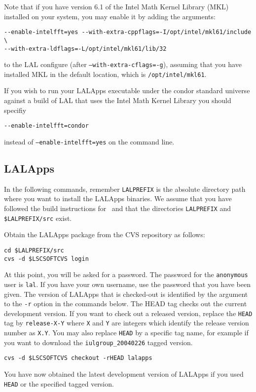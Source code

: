 Note that if you have version 6.1 of the Intel Math Kernel Library (MKL)
installed on your system, you may enable it by adding the arguments:
\begin{verbatim}
--enable-intelfft=yes --with-extra-cppflags=-I/opt/intel/mkl61/include \
--with-extra-ldflags=-L/opt/intel/mkl61/lib/32
\end{verbatim}
to the LAL configure (after \texttt{--with-extra-cflags=-g}), assuming that
you have installed MKL in the default location, which is
\texttt{/opt/intel/mkl61}.

If you wish to run your LALApps executable under the condor standard universe
against a build of LAL that uses the Intel Math Kernel Library you should
specifiy
\begin{verbatim}
--enable-intelfft=condor
\end{verbatim}
instead of \texttt{--enable-intelfft=yes} on the command line.


\color{black}
\subsection{LALApps}
\color{black}

In the following commands, remember \verb+LALPREFIX+ is the absolute
directory path where you want to install the LALApps binaries.  We
assume that you have followed the build instructions for \lal\ and
that the directories \verb+LALPREFIX+ and \verb+$LALPREFIX/src+ exist.

Obtain the LALApps package from the CVS repository as follows:  
\begin{verbatim}
cd $LALPREFIX/src
cvs -d $LSCSOFTCVS login
\end{verbatim}
At this point,  you will be asked for a password.  The password for the
\verb+anonymous+ user is \verb+lal+. If you have your own username, use the
password that you have been given.
The version of LALApps that is checked-out is identified by the argument
to the \texttt{-r} option in the commands below.   The HEAD tag checks out the
current development version.  If you want to check out a released
version, replace the \verb+HEAD+ tag by \verb+release-X-Y+ where
\verb+X+ and \verb+Y+ are integers which identify the release version
number as \verb+X.Y+. You may also replace \verb+HEAD+ by a specific tag name,
for example if you want to download the \verb+iulgroup_20040226+ tagged
version.
\begin{verbatim}
cvs -d $LSCSOFTCVS checkout -rHEAD lalapps
\end{verbatim}
You have now obtained the latest development version of LALApps if you used
\verb+HEAD+ or the specified tagged version.


